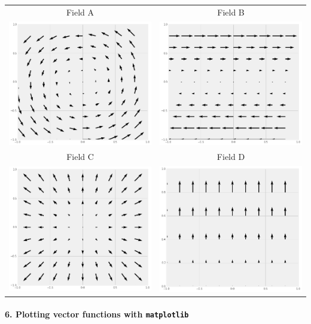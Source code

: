 \documentclass[11pt]{article}
\def\toprule{}
\def\bottomrule{}
\begin{document}
\begin{longtable}[]{@{}cc@{}}
\toprule
Field A & Field B\tabularnewline
\includegraphics[width=0.4\linewidth]{./images/hw1/A.png} &
\includegraphics[width=0.4\linewidth]{./images/hw1/B.png}\tabularnewline
Field C & Field D\tabularnewline
\includegraphics[width=0.4\linewidth]{./images/hw1/C.png} &
\includegraphics[width=0.4\linewidth]{./images/hw1/D.png}\tabularnewline
\bottomrule
\end{longtable}

\paragraph{\texorpdfstring{6. Plotting vector functions with
\texttt{matplotlib}}{6. Plotting vector functions with matplotlib}}\label{plotting-vector-functions-with-matplotlib}
\end{document}
